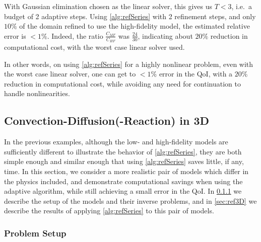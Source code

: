 {With Gaussian elimination chosen as the linear solver, this gives us $T < 3$, i.e.\ a budget of 2 adaptive steps. Using \cref{alg:refSeries} with 2 refinement steps, and only $10\%$ of the domain refined to use the high-fidelity model, the estimated relative error is $<1\%$. Indeed, the ratio $\frac{C_{MF}}{C_{HF}}$ was $\frac{24}{30}$, indicating about $20\%$ reduction in computational cost, with the worst case linear solver used. 

In other words, on using \cref{alg:refSeries} for a highly nonlinear problem, even with the worst case linear solver, one can get to $<1\%$ error in the QoI, with a $20\%$ reduction in computational cost, while avoiding any need for continuation to handle nonlinearities. }

\subsection{Convection-Diffusion(-Reaction) in 3D} \label{sec:cdvcdr3D}

In the previous examples, although the low- and high-fidelity models are sufficiently different to illustrate the behavior of \cref{alg:refSeries}, they are both simple enough and similar enough that using \cref{alg:refSeries} saves little, if any, time. In this section, we consider a more realistic pair of models which differ in the physics included, and demonstrate computational savings when using the adaptive algorithm, while still achieving a small error in the QoI. In \cref{sec:setup3D} we describe the setup of the models and their inverse problems, and in \cref{sec:ref3D} we describe the results of applying \cref{alg:refSeries} to this pair of models.

\subsubsection{Problem Setup} \label{sec:setup3D}

